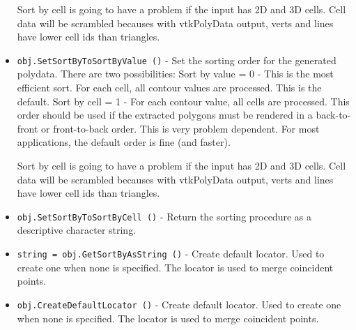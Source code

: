 \begin{itemize}
 Sort by cell is going to have a problem if the input has 2D and 3D cells.
 Cell data will be scrambled becauses with 
 vtkPolyData output, verts and lines have lower cell ids than triangles.

\item  \verb|obj.SetSortByToSortByValue ()| -  Set the sorting order for the generated polydata. There are two
 possibilities:
   Sort by value = 0 - This is the most efficient sort. For each cell,
      all contour values are processed. This is the default.
   Sort by cell = 1 - For each contour value, all cells are processed.
      This order should be used if the extracted polygons must be rendered
      in a back-to-front or front-to-back order. This is very problem 
      dependent.
 For most applications, the default order is fine (and faster).

 Sort by cell is going to have a problem if the input has 2D and 3D cells.
 Cell data will be scrambled becauses with 
 vtkPolyData output, verts and lines have lower cell ids than triangles.

\item  \verb|obj.SetSortByToSortByCell ()| -  Return the sorting procedure as a descriptive character string.

\item  \verb|string = obj.GetSortByAsString ()| -  Create default locator. Used to create one when none is specified. The 
 locator is used to merge coincident points.

\item  \verb|obj.CreateDefaultLocator ()| -  Create default locator. Used to create one when none is specified. The 
 locator is used to merge coincident points.

\end{itemize}
